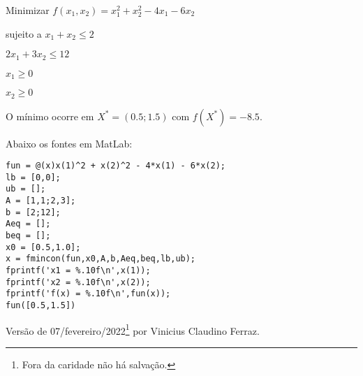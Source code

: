 \documentclass{rbfin}
\begin{document}
Minimizar $f(x_1, x_2) = x_1^2 + x_2^2 - 4x_1 - 6x_2$

sujeito a $x_1 + x_2 \le 2$

$2x_1 + 3x_2 \le 12$

$x_1 \ge 0$

$x_2 \ge 0$

O mínimo ocorre em $X^* = (0.5; 1.5)$ com $f(X^*) = -8.5$.

Abaixo os fontes em MatLab:

\singlespacing

\begin{verbatim}
fun = @(x)x(1)^2 + x(2)^2 - 4*x(1) - 6*x(2);
lb = [0,0];
ub = [];
A = [1,1;2,3];
b = [2;12];
Aeq = [];
beq = [];
x0 = [0.5,1.0];
x = fmincon(fun,x0,A,b,Aeq,beq,lb,ub);
fprintf('x1 = %.10f\n',x(1));
fprintf('x2 = %.10f\n',x(2));
fprintf('f(x) = %.10f\n',fun(x));
fun([0.5,1.5])
\end{verbatim}

\vspace{6mm}

Versão de 07/fevereiro/2022\footnote{Fora da caridade não há salvação.} por Vinicius Claudino Ferraz.
\end{document}
